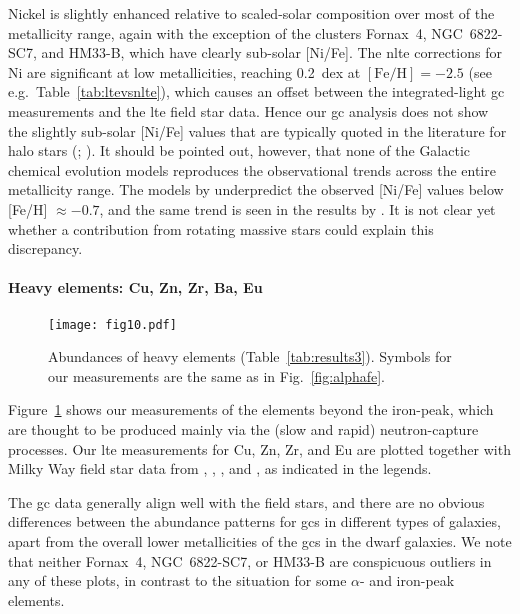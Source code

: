 \documentclass{aa}
\begin{document}
Nickel is slightly enhanced relative to scaled-solar composition over most of the metallicity range, again with the exception of the clusters Fornax~4, NGC~6822-SC7, and HM33-B, which have clearly sub-solar [Ni/Fe].
The \ac{nlte} corrections for Ni are significant at low metallicities, reaching 0.2~dex at $\mathrm{[Fe/H]}=-2.5$ (see e.g.\ Table~\ref{tab:ltevsnlte}), which causes an offset between the integrated-light \ac{gc} measurements and the \ac{lte} field star data. 
Hence our \ac{gc} analysis does not show the slightly sub-solar [Ni/Fe] values that are typically quoted in the literature for halo stars (\citealt{Gratton1987}; ). It should be pointed out, however, that none of the Galactic chemical evolution models reproduces the observational trends across the entire metallicity range. The models by \citet{Kobayashi2019} underpredict the observed [Ni/Fe] values below [Fe/H] $\approx -0.7$, and the same trend is seen in the results by \citet{Palla2021}. It is not clear yet whether a
contribution from  rotating massive stars \citep[e.g.][]{Limongi2018} could explain this discrepancy.

\paragraph{Heavy elements: Cu, Zn, Zr, Ba, Eu}

\begin{figure}
\centering
\texttt{[image: fig10.pdf]}
\caption{\label{fig:heavy}Abundances of heavy elements (Table~\ref{tab:results3}). Symbols for our measurements are the same as in Fig.~\ref{fig:alphafe}.} 
\end{figure}


Figure~\ref{fig:heavy} shows our measurements of the elements beyond the iron-peak, which are thought to be produced mainly via the (slow and rapid) neutron-capture processes. 
Our \ac{lte} measurements for Cu, Zn, Zr, and Eu are plotted together with Milky Way field star data from \citet[][F2010]{Frebel2010}, , \citet[][B2017]{Bensby2017}, and \citet[][VdS2016]{VanderSwaelmen2016}, as indicated in the legends. 

The \ac{gc} data generally align well with the field stars, and there are no obvious differences between the abundance patterns for \acp{gc} in different types of galaxies, apart from the overall lower metallicities of the \acp{gc} in the dwarf galaxies. We note that neither Fornax~4, NGC~6822-SC7, or HM33-B are conspicuous outliers in any of these plots, in contrast to the situation for some $\alpha$- and iron-peak elements.
\end{document}
